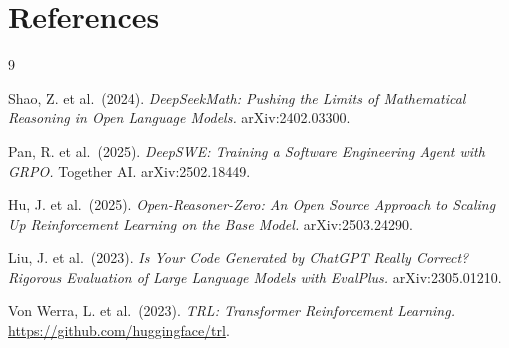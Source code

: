 \documentclass[11pt,a4paper]{article}
\begin{document}
\section*{References}

\begin{thebibliography}{9}

Shao, Z. et al.\ (2024).
\textit{DeepSeekMath: Pushing the Limits of Mathematical Reasoning in Open Language Models.}
arXiv:2402.03300.

Pan, R. et al.\ (2025).
\textit{DeepSWE: Training a Software Engineering Agent with GRPO.}
Together AI. arXiv:2502.18449.

Hu, J. et al.\ (2025).
\textit{Open-Reasoner-Zero: An Open Source Approach to Scaling Up Reinforcement Learning on the Base Model.}
arXiv:2503.24290.

Liu, J. et al.\ (2023).
\textit{Is Your Code Generated by ChatGPT Really Correct? Rigorous Evaluation of Large Language Models with EvalPlus.}
arXiv:2305.01210.

Von Werra, L. et al.\ (2023).
\textit{TRL: Transformer Reinforcement Learning.}
\url{https://github.com/huggingface/trl}.

\end{thebibliography}
\end{document}
